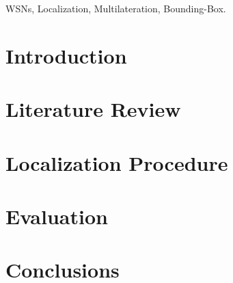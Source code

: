 \documentclass[conference]{IEEEtran}
\begin{document}
\begin{IEEEkeywords}
WSNs, Localization, Multilateration, Bounding-Box.
\end{IEEEkeywords}

% 
% 


\section{Introduction} \label{introduction}
  

\section{Literature Review} \label{literature}
  

\section{Localization Procedure} \label{locProc}
  

\section{Evaluation} \label{simulation}
  

\section{Conclusions} \label{conclusions}
  



\end{document}
